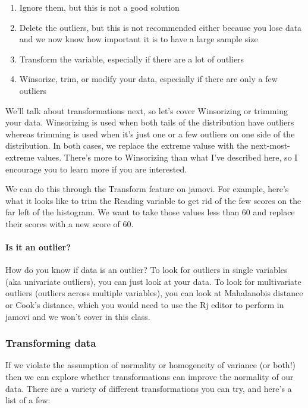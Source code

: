 \documentclass[
]{book}
\providecommand{\tightlist}{%
  \setlength{\itemsep}{0pt}\setlength{\parskip}{0pt}}
\begin{document}
\begin{enumerate}
\def\labelenumi{\arabic{enumi}.}
\tightlist
\item
  Ignore them, but this is not a good solution
\item
  Delete the outliers, but this is not recommended either because you lose data and we now know how important it is to have a large sample size
\item
  Transform the variable, especially if there are a lot of outliers
\item
  Winsorize, trim, or modify your data, especially if there are only a few outliers
\end{enumerate}

We'll talk about transformations next, so let's cover Winsorizing or trimming your data. Winsorizing is used when both tails of the distribution have outliers whereas trimming is used when it's just one or a few outliers on one side of the distribution. In both cases, we replace the extreme valuse with the next-most-extreme values. There's more to Winsorizing than what I've described here, so I encourage you to learn more if you are interested.

We can do this through the Transform feature on jamovi. For example, here's what it looks like to trim the Reading variable to get rid of the few scores on the far left of the histogram. We want to take those values less than 60 and replace their scores with a new score of 60.

\hypertarget{is-it-an-outlier}{%
\paragraph{Is it an outlier?}\label{is-it-an-outlier}}

How do you know if data is an outlier? To look for outliers in single variables (aka univariate outliers), you can just look at your data. To look for multivariate outliers (outliers across multiple variables), you can look at Mahalanobis distance or Cook's distance, which you would need to use the Rj editor to perform in jamovi and we won't cover in this class.

\hypertarget{transforming-data}{%
\subsubsection{Transforming data}\label{transforming-data}}

If we violate the assumption of normality or homogeneity of variance (or both!) then we can explore whether transformations can improve the normality of our data. There are a variety of different transformations you can try, and here's a list of a few:
\end{document}
